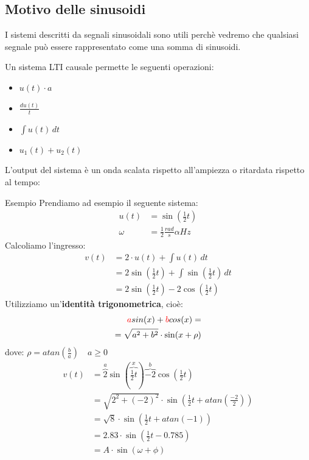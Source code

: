 \documentclass[a4paper]{article}
\begin{document}
\subsection{Motivo delle sinusoidi}
I sistemi descritti da segnali sinusoidali sono utili perchè
vedremo che qualsiasi segnale può essere rappresentato come una somma di sinusoidi.

\vspace{1em}
\noindent
Un sistema LTI causale permette le seguenti operazioni:
\begin{itemize}
  \item \( u(t) \cdot a \) 
  \item \( \frac{d u(t)}{t} \) 
  \item \( \int u(t) \,dt \) 
  \item \( u_1(t) + u_2(t) \) 
\end{itemize}
L'output del sistema è un onda scalata rispetto all'ampiezza o ritardata rispetto al
tempo:

\begin{examplebox}{Esempio}
  Prendiamo ad esempio il seguente sistema:
  \[
  \begin{aligned}
    u(t) &= \sin(\frac{1}{2}t)\\
    \omega &= \frac{1}{2} \frac{rad}{s} \alpha Hz
  \end{aligned}
  \] 
  Calcoliamo l'ingresso:
  \[
  \begin{aligned}
    v(t) &= 2 \cdot u(t) + \int u(t) \,dt\\
         &= 2 \sin(\frac{1}{2}t) + \int \sin(\frac{1}{2}t) \,dt\\
         &= 2 \sin(\frac{1}{2}t) - 2 \cos(\frac{1}{2}t)
  \end{aligned}
  \] 
  Utilizziamo un'\textbf{identità trigonometrica}, cioè:
  \[
    \begin{aligned}
      \color{red}a \color{black} sin(x) + \color{red} b \color{black} cos(x) =\\
      = \sqrt{a^2 + b^2} \cdot \sin(x + \rho )
    \end{aligned}
  \] 
  dove: \( \rho = atan\left(\frac{b}{a}\right) \quad a \ge 0 \) 
  \[
  \begin{aligned}
    v(t) &= \overbrace{2}^{a} \sin(\overbrace{\frac{1}{2}t}^{x}) \overbrace{- 2}^{b} \cos(\frac{1}{2}t)\\
         &= \sqrt{2^2 + (-2)^2} \cdot  \sin\left(\frac{1}{2}t + atan\left(\frac{-2}{2}\right)\right)\\
         &= \sqrt{8} \cdot  \sin\left(\frac{1}{2}t + atan(-1)\right)\\
         &= 2.83 \cdot \sin\left(\frac{1}{2}t - 0.785\right)\\
         &= A \cdot \sin(\omega + \phi)
  \end{aligned}
  \] 
\end{examplebox}
\end{document}
